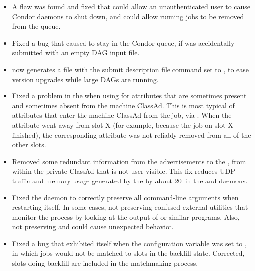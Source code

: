\begin{itemize}

\item \Security A flaw was found and fixed that could allow an unauthenticated
user to cause Condor daemons to shut down,
and could allow running jobs to be removed from the queue.

\item Fixed a bug that caused  to stay in the Condor queue,
if  was accidentally submitted with an empty DAG input file.

\item {} now generates a  file with
the submit description file command 
set to , to ease version upgrades while
large DAGs are running.

\item Fixed a problem in the  when using
 for attributes that are sometimes
present and sometimes absent from the machine ClassAd.  This is most
typical of attributes that enter the machine ClassAd from the job, via
.  When the attribute went away from slot X
(for example, because the job on slot X finished), the corresponding
 attribute was not reliably removed from
all of the other slots.

\item Removed some redundant information from the  
advertisements to the , 
from within the private ClassAd that is not user-visible.
This fix reduces UDP traffic and memory usage generated by
the  by about 20\Percent\
in the  and  daemons.

\item Fixed the  daemon to correctly preserve all command-line
arguments when restarting itself.  In some cases, not preserving 
confused external utilities that monitor the \Condor{master} process by looking
at the output of \Prog{ps} or similar programs.  Also, not preserving
\Opt{-pid} and \Opt{-runfor} could cause unexpected behavior.

\item Fixed a bug that exhibited itself when
the configuration variable 
was set to \Expr{False}, in which jobs
would not be matched to slots in the backfill state.  Corrected, slots doing
backfill are included in the matchmaking process.


\end{itemize}
